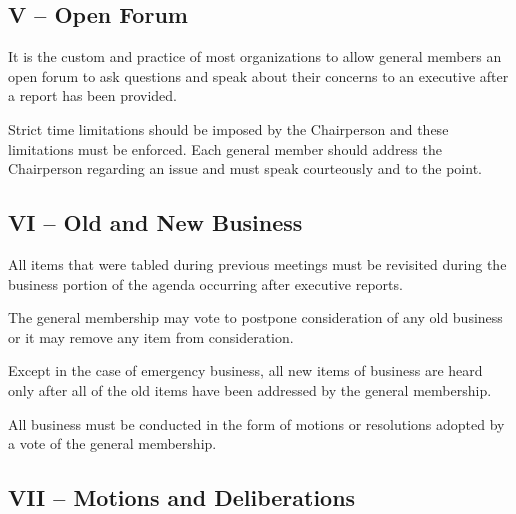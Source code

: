 \documentclass[12pt,a4paper]{article}
\begin{document}
\subsection*{V – Open Forum}

\begin{constitutionlist}
\item It is the custom and practice of most organizations to allow general members an open forum to ask questions and speak about their concerns to an executive after a report has been provided.

\item Strict time limitations should be imposed by the Chairperson and these limitations must be enforced. Each general member should address the Chairperson regarding an issue and must speak courteously and to the point.
\end{constitutionlist}

\subsection*{VI – Old and New Business}

\begin{constitutionlist}
\item All items that were tabled during previous meetings must be revisited during the business portion of the agenda occurring after executive reports.

\item The general membership may vote to postpone consideration of any old business or it may remove any item from consideration.

\item Except in the case of emergency business, all new items of business are heard only after all of the old items have been addressed by the general membership.

\item All business must be conducted in the form of motions or resolutions adopted by a vote of the general membership.
\end{constitutionlist}

\subsection*{VII – Motions and Deliberations}
\end{document}
